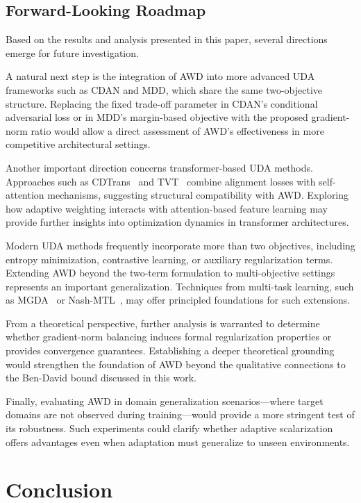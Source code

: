 \documentclass[pdflatex,sn-mathphys-num]{sn-jnl}
\theoremstyle{thmstyleone}
\theoremstyle{thmstyletwo}
\theoremstyle{thmstylethree}
\begin{document}
\subsection{Forward-Looking Roadmap}

Based on the results and analysis presented in this paper, several directions emerge for future investigation. 

A natural next step is the integration of AWD into more advanced UDA frameworks such as CDAN and MDD, which share the same two-objective structure. Replacing the fixed trade-off parameter in CDAN’s conditional adversarial loss or in MDD’s margin-based objective with the proposed gradient-norm ratio would allow a direct assessment of AWD’s effectiveness in more competitive architectural settings.

Another important direction concerns transformer-based UDA methods. Approaches such as CDTrans~\cite{xu2022cdtrans} and TVT~\cite{yang2023tvt} combine alignment losses with self-attention mechanisms, suggesting structural compatibility with AWD. Exploring how adaptive weighting interacts with attention-based feature learning may provide further insights into optimization dynamics in transformer architectures.

Modern UDA methods frequently incorporate more than two objectives, including entropy minimization, contrastive learning, or auxiliary regularization terms. Extending AWD beyond the two-term formulation to multi-objective settings represents an important generalization. Techniques from multi-task learning, such as MGDA~\cite{sener2018mgda} or Nash-MTL~\cite{navon2022nashmtl}, may offer principled foundations for such extensions.

From a theoretical perspective, further analysis is warranted to determine whether gradient-norm balancing induces formal regularization properties or provides convergence guarantees. Establishing a deeper theoretical grounding would strengthen the foundation of AWD beyond the qualitative connections to the Ben-David bound discussed in this work.

Finally, evaluating AWD in domain generalization scenarios—where target domains are not observed during training—would provide a more stringent test of its robustness. Such experiments could clarify whether adaptive scalarization offers advantages even when adaptation must generalize to unseen environments.



\section{Conclusion}
\label{sec:conclusion}
\end{document}
